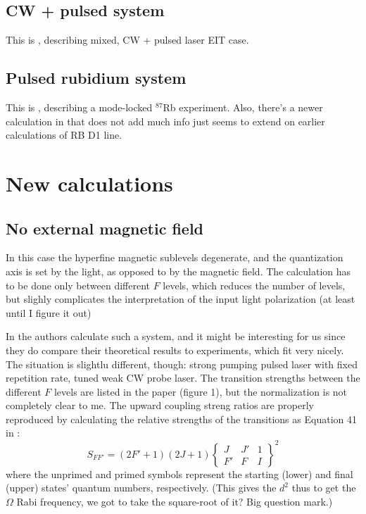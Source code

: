 \documentclass{article}
\begin{document}
\begin{spacing}{1.1}
\subsection{CW + pulsed system}
This is \cite{Soares2010}, describing mixed, CW + pulsed laser EIT case.

\subsection{Pulsed rubidium system}
This is \cite{Arissian2006}, describing a mode-locked $^{87}$Rb experiment. Also, there's a newer calculation in \cite{Aumiler2010} that does not add much info just seems to extend on earlier calculations of RB D1 line.


\section{New calculations}

\subsection{No external magnetic field}

In this case the hyperfine magnetic sublevels degenerate, and the quantization axis is set by the light, as opposed to by the magnetic field. The calculation has to be done only between different $F$ levels, which reduces the number of levels, but slighly complicates the interpretation of the input light polarization (at least until I figure it out)

In \cite{Vujicic2007} the authors calculate such a system, and it might be interesting for us since they do compare their theoretical results to experiments, which fit very nicely. The situation is slightlu different, though: strong pumping pulsed laser with fixed repetition rate, tuned weak CW probe laser. The transition strengths between the different $F$ levels are listed in the paper (figure 1), but the normalization is not completely clear to me. The upward coupling streng ratios are properly reproduced by calculating the relative strengths of the transitions as Equation 41 in \cite{Steck2009}:
\begin{equation}
S_{FF'} = (2 F' + 1)(2 J + 1)\left\{ \begin{matrix}  J & J' & 1 \\  F' & F & I \end{matrix}\right\}^2
\end{equation}
where the unprimed and primed symbols represent the starting (lower) and final (upper) states' quantum numbers, respectively. (This gives the $d^2$ thus to get the $\Omega$ Rabi frequency, we got to take the square-root of it? Big question mark.)


\end{spacing}
\end{document}
